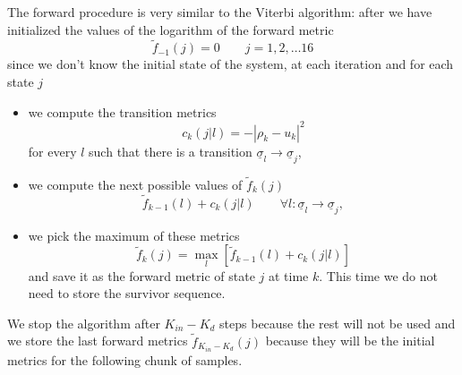 \documentclass[a4paper,oneside]{article}
\renewcommand{\vec}[1]{\underline{#1}}
\newcommand{\abs}[1]{\left|#1\right|}
\newcommand{\vsigma}[0]{\vec{\sigma}}
\begin{document}
The forward procedure is very similar to the Viterbi algorithm: after
we have initialized the values of the logarithm of the forward metric
\begin{equation}
  \tilde{f}_{-1}(j) = 0 \qquad j=1,2,\dots 16
\end{equation}
since we don't know the initial state of the system, at each iteration
and for each state $j$
\begin{itemize}
  \item we compute the transition metrics
    \begin{equation}
      c_k(j|l) = -\abs{\rho_k - u_k}^2
    \end{equation}
    for every $l$ such that there is a transition $\vsigma_l
    \rightarrow \vsigma_j$,
  \item we compute the next possible values of $\tilde{f}_k(j)$
    \begin{equation}
      \tilde{f}_{k-1}(l) + c_k(j|l) \qquad \forall l : \vsigma_l
      \rightarrow \vsigma_j ,
    \end{equation}
  \item we pick the maximum of these metrics
    \begin{equation}
       \tilde{f}_{k}(j)  = \max_{l} \left[ \tilde{f}_{k-1}(l) + c_k(j|l) \right] 
    \end{equation}
    and save it as the forward metric of state $j$ at time $k$. This
    time we do not need to store the survivor sequence.
\end{itemize}
We stop the algorithm after $K_{in} - K_d$ steps because the rest will
not be used and we store the last forward metrics $\tilde{f}_{K_{in} -
  K_d}(j)$ because they will be the initial metrics for the following
chunk of samples.
\end{document}
